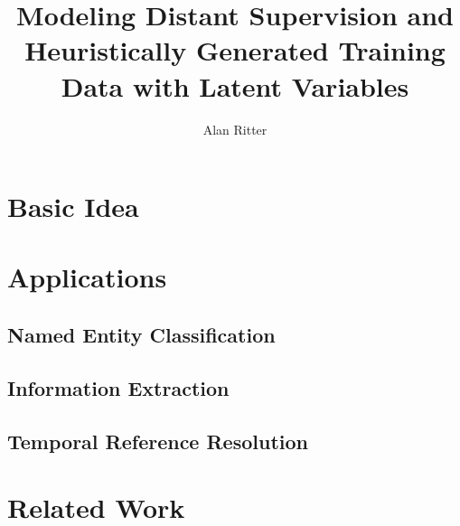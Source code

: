 \documentclass[12pt]{article}
\begin{document}
\date{}
\title{Modeling Distant Supervision and Heuristically Generated Training Data with Latent Variables}
\author{Alan Ritter}
\maketitle



\section{Basic Idea}

\section{Applications}

\subsection{Named Entity Classification}

\subsection{Information Extraction}

\subsection{Temporal Reference Resolution}

\section{Related Work}




\end{document}
